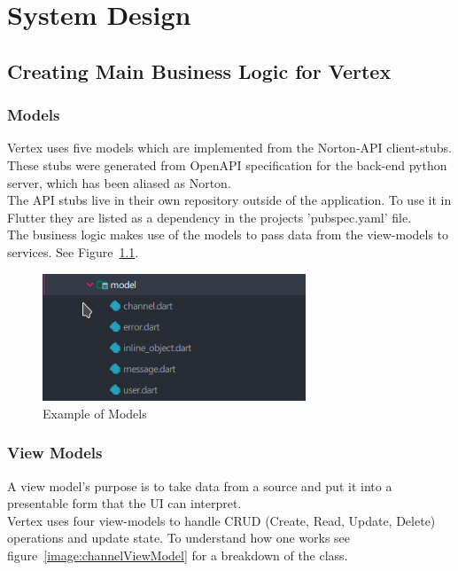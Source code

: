 \chapter{System Design}
\section{Creating Main Business Logic for Vertex}
\subsection{Models}
Vertex uses five models which are implemented from the Norton-API client-stubs. These stubs were generated from OpenAPI specification for the back-end python server, which has been aliased as Norton.
\\ The API stubs live in their own repository outside of the application. To use it in Flutter they are listed as a dependency in the projects 'pubspec.yaml' file.
\\ The business logic makes use of the models to pass data from the view-models to services.
See Figure~\ref{image:models}.

\begin{figure}[h!]
    \caption{Example of Models}
    \label{image:models}
    \centering
    \includegraphics[width=0.7\textwidth]{images/models.png}
\end{figure}

\subsection{View Models}
A view model's purpose is to take data from a source and put it into a presentable form that the UI can interpret.
\\ Vertex uses four view-models to handle CRUD (Create, Read, Update, Delete) operations and update state. To understand how one works see figure~\ref{image:channelViewModel} for a breakdown of the class.

